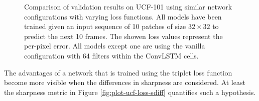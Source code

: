 \begin{figure}[htb]
\begin{subfigure}{0.5\textwidth}
  \modelE
  \hspace*{-0.6cm}
  {
  }
  \caption{}
  \label{fig:plot-ucf-loss-mae}
\end{subfigure}
\caption[Comparison of Losses on UCF-101]{Comparison of validation results on UCF-101 using similar network configurations with varying loss functions. All models have been trained given an input sequence of 10 patches of size $32 \times 32$ to predict the next 10 frames. The showen loss values represent the per-pixel error. All models except one are using the vanilla configuration with 64 filters within the ConvLSTM cells.} \label{fig:plot-ucf-loss}
\end{figure}

The advantages of a network that is trained using the triplet loss function become more visible when the differences in sharpness are considered. At least the sharpness metric in Figure \ref{fig:plot-ucf-loss-sdiff} quantifies such a hypothesis.



